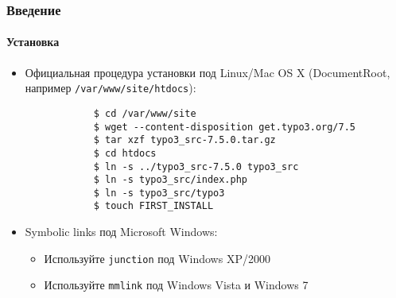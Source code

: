 \begin{frame}[fragile]
	\frametitle{Введение}
	\framesubtitle{Установка}

	\begin{itemize}
		\item Официальная процедура установки под Linux/Mac OS X\newline
			(DocumentRoot, например \texttt{/var/www/site/htdocs}):
		\begin{lstlisting}
			$ cd /var/www/site
			$ wget --content-disposition get.typo3.org/7.5
			$ tar xzf typo3_src-7.5.0.tar.gz
			$ cd htdocs
			$ ln -s ../typo3_src-7.5.0 typo3_src
			$ ln -s typo3_src/index.php
			$ ln -s typo3_src/typo3
			$ touch FIRST_INSTALL
		\end{lstlisting}

		\item Symbolic links под Microsoft Windows:

			\begin{itemize}
				\item Используйте \texttt{junction} под Windows XP/2000
				\item Используйте \texttt{mmlink} под Windows Vista и Windows 7
			\end{itemize}

	\end{itemize}
\end{frame}

